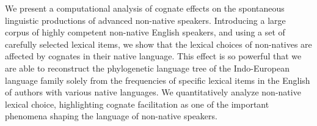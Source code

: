 We present a computational analysis of cognate effects on the spontaneous linguistic productions of advanced non-native speakers. Introducing a large corpus of highly competent non-native English speakers, and using a set of carefully selected lexical items, we show that the lexical choices of non-natives are affected by cognates in their native language. This effect is so powerful that we are able to reconstruct the phylogenetic language tree of the Indo-European language family solely from the frequencies of specific lexical items in the English of authors with various native languages. We quantitatively analyze non-native lexical choice, highlighting cognate facilitation as one of the important phenomena shaping the language of non-native speakers.